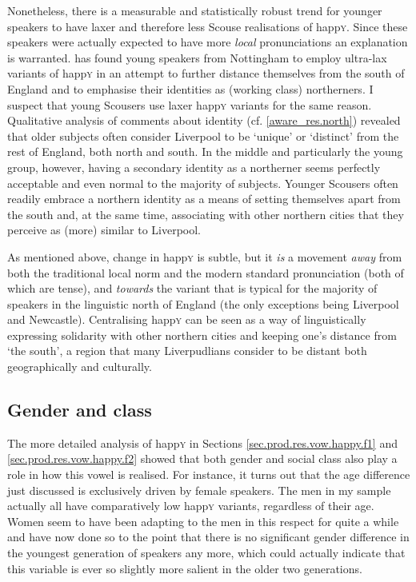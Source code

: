 Nonetheless, there is a measurable and statistically robust trend for younger speakers to have laxer and therefore less Scouse realisations of happ\textsc{y}.
Since these speakers were actually expected to have more \emph{local} pronunciations an explanation is warranted.
\textcite{flynn2010} has found young speakers from Nottingham to employ ultra-lax variants of happ\textsc{y} in an attempt to further distance themselves from the south of England and to emphasise their identities as (working class) northerners.
I suspect that young Scousers use laxer happ\textsc{y} variants for the same reason.
Qualitative analysis of comments about identity (cf. \ref{aware_res.north}) revealed that older subjects often consider Liverpool to be `unique' or `distinct' from the rest of England, both north and south.
In the middle and particularly the young group, however, having a secondary identity as a northerner seems perfectly acceptable and even normal to the majority of subjects.
Younger Scousers often readily embrace a northern identity as a means of setting themselves apart from the south and, at the same time, associating with other northern cities that they perceive as (more) similar to Liverpool.

As mentioned above, change in happ\textsc{y} is subtle, but it \emph{is} a movement \emph{away} from both the traditional local norm and the modern standard pronunciation (both of which are tense), and \emph{towards} the variant that is typical for the majority of speakers in the linguistic north of England (the only exceptions being Liverpool and Newcastle).
Centralising happ\textsc{y} can be seen as a way of linguistically expressing solidarity with other northern cities and keeping one's distance from `the south', a region that many Liverpudlians consider to be distant both geographically and culturally.

\subsection{Gender and class}
\label{prod.disc.happy.social}

The more detailed analysis of happ\textsc{y} in Sections \ref{sec.prod.res.vow.happy.f1} and \ref{sec.prod.res.vow.happy.f2} showed that both gender and social class also play a role in how this vowel is realised.
For instance, it turns out that the age difference just discussed is exclusively driven by female speakers.
The men in my sample actually all have comparatively low happ\textsc{y} variants, regardless of their age.
Women seem to have been adapting to the men in this respect for quite a while and have now done so to the point that there is no significant gender difference in the youngest generation of speakers any more, which could actually indicate that this variable is ever so slightly more salient in the older two generations.

